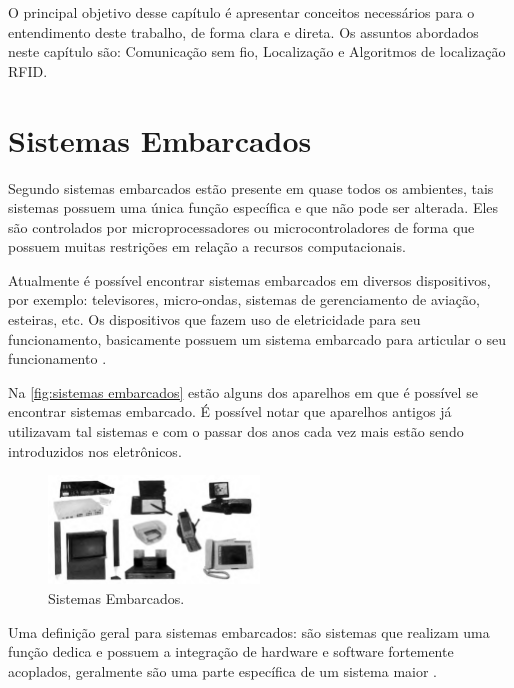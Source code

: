 \label{chapter:conceitos}
O principal objetivo desse capítulo é apresentar conceitos necessários para o entendimento deste trabalho, de forma clara e direta. Os assuntos abordados neste capítulo são: Comunicação sem fio, Localização e Algoritmos de localização RFID.
\section{Sistemas Embarcados}
    \par
    Segundo \citeauthor{rodrigo2016} sistemas embarcados estão presente em quase todos os ambientes, tais sistemas possuem uma única função específica e que não pode ser alterada. Eles são controlados por microprocessadores ou microcontroladores de forma que possuem muitas restrições em relação a recursos computacionais.

    \par
    Atualmente é possível encontrar sistemas embarcados em diversos dispositivos, por exemplo: televisores, micro-ondas, sistemas de gerenciamento de aviação, esteiras, etc. Os dispositivos que fazem uso de eletricidade para seu funcionamento, basicamente possuem um sistema embarcado para articular o seu funcionamento \cite{rodrigo2016}.
    
    \par
    Na \autoref{fig:sistemas embarcados} estão alguns dos aparelhos em que é possível se encontrar sistemas embarcado. É possível notar que aparelhos antigos já utilizavam tal sistemas e com o passar dos anos cada vez mais estão sendo introduzidos nos eletrônicos.
    \begin{figure}[h!]
              \caption{\label{fig:sistemas embarcados}{Sistemas Embarcados.}}
              \centering
              \includegraphics[width=0.5\textwidth]{Figuras/systems_embedded.PNG}
            \end{figure}
    \par
    Uma definição geral para sistemas embarcados: são sistemas que realizam uma função dedica e possuem a integração de hardware e software fortemente acoplados, geralmente são uma parte específica de um sistema maior \cite{Li:2003:RCE:829584}.
    
